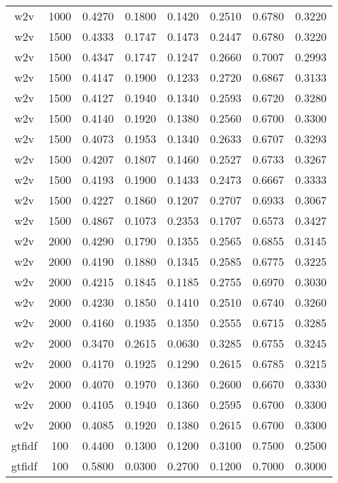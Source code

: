 \begin{scriptsize}
\begin{longtable}{cccccccc}
		w2v      & 1000 & 0.4270 & 0.1800 & 0.1420 & 0.2510 & 0.6780 & 0.3220 \\
		w2v      & 1500 & 0.4333 & 0.1747 & 0.1473 & 0.2447 & 0.6780 & 0.3220 \\
		w2v      & 1500 & 0.4347 & 0.1747 & 0.1247 & 0.2660 & 0.7007 & 0.2993 \\
		w2v      & 1500 & 0.4147 & 0.1900 & 0.1233 & 0.2720 & 0.6867 & 0.3133 \\
		w2v      & 1500 & 0.4127 & 0.1940 & 0.1340 & 0.2593 & 0.6720 & 0.3280 \\
		w2v      & 1500 & 0.4140 & 0.1920 & 0.1380 & 0.2560 & 0.6700 & 0.3300 \\
		w2v      & 1500 & 0.4073 & 0.1953 & 0.1340 & 0.2633 & 0.6707 & 0.3293 \\
		w2v      & 1500 & 0.4207 & 0.1807 & 0.1460 & 0.2527 & 0.6733 & 0.3267 \\
		w2v      & 1500 & 0.4193 & 0.1900 & 0.1433 & 0.2473 & 0.6667 & 0.3333 \\
		w2v      & 1500 & 0.4227 & 0.1860 & 0.1207 & 0.2707 & 0.6933 & 0.3067 \\
		w2v      & 1500 & 0.4867 & 0.1073 & 0.2353 & 0.1707 & 0.6573 & 0.3427 \\
		w2v      & 2000 & 0.4290 & 0.1790 & 0.1355 & 0.2565 & 0.6855 & 0.3145 \\
		w2v      & 2000 & 0.4190 & 0.1880 & 0.1345 & 0.2585 & 0.6775 & 0.3225 \\
		w2v      & 2000 & 0.4215 & 0.1845 & 0.1185 & 0.2755 & 0.6970 & 0.3030 \\
		w2v      & 2000 & 0.4230 & 0.1850 & 0.1410 & 0.2510 & 0.6740 & 0.3260 \\
		w2v      & 2000 & 0.4160 & 0.1935 & 0.1350 & 0.2555 & 0.6715 & 0.3285 \\
		w2v      & 2000 & 0.3470 & 0.2615 & 0.0630 & 0.3285 & 0.6755 & 0.3245 \\
		w2v      & 2000 & 0.4170 & 0.1925 & 0.1290 & 0.2615 & 0.6785 & 0.3215 \\
		w2v      & 2000 & 0.4070 & 0.1970 & 0.1360 & 0.2600 & 0.6670 & 0.3330 \\
		w2v      & 2000 & 0.4105 & 0.1940 & 0.1360 & 0.2595 & 0.6700 & 0.3300 \\
		w2v      & 2000 & 0.4085 & 0.1920 & 0.1380 & 0.2615 & 0.6700 & 0.3300 \\
		gtfidf   & 100  & 0.4400 & 0.1300 & 0.1200 & 0.3100 & 0.7500 & 0.2500 \\
		gtfidf   & 100  & 0.5800 & 0.0300 & 0.2700 & 0.1200 & 0.7000 & 0.3000 \\

\end{longtable}
\end{scriptsize}
